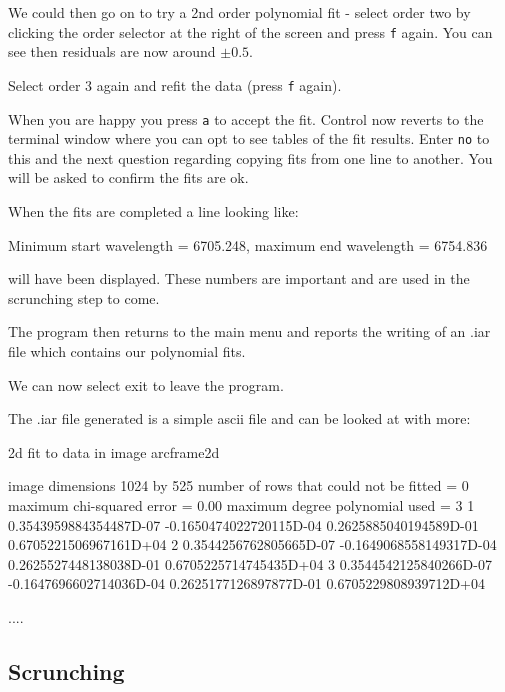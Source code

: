 \documentclass[twoside,11pt]{starlink}
\providecommand{\scspec}[2]{#1}
\begin{document}
We could then go on to try a 2nd order polynomial fit - select order
two by clicking the order selector at the right of the screen and
press \texttt{f} again. You can see then residuals are now around
$\pm0.5$.

Select order 3 again and refit the data (press \texttt{f} again).

When you are happy you press \texttt{a} to accept the fit. Control now
reverts to the terminal window where you can opt to see tables of the
fit results. Enter \texttt{no} to this and the next question regarding
copying fits from one line to another. You will be asked to confirm
the fits are ok.

When the fits are completed a line looking like:
{\scspec{\small}{ }
\begin{terminalv}
Minimum start wavelength = 6705.248, maximum end wavelength = 6754.836
\end{terminalv}
}

will have been displayed. These numbers are important and are used in
the scrunching step to come.

The program then returns to the main menu and reports the writing of
an .iar file which contains our polynomial fits.

We can now select exit to leave the program.

The .iar file generated is a simple ascii file and can be looked at with more:

{\scspec{\small}{ }
\begin{terminalv}

 2d fit to data in image arcframe2d

image dimensions  1024 by   525
number of rows that could not be fitted =     0
maximum chi-squared error =       0.00
maximum degree polynomial used =   3
             1            0.3543959884354487D-07 -0.1650474022720115D-04
  0.2625885040194589D-01  0.6705221506967161D+04
             2            0.3544256762805665D-07 -0.1649068558149317D-04
  0.2625527448138038D-01  0.6705225714745435D+04
             3            0.3544542125840266D-07 -0.1647696602714036D-04
  0.2625177126897877D-01  0.6705229808939712D+04

....
\end{terminalv}
}

\subsection{Scrunching}
\end{document}

